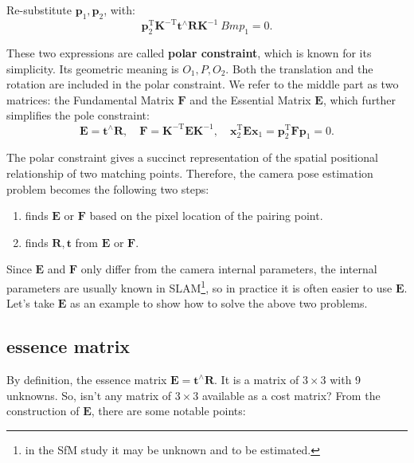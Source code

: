 Re-substitute $\bm{p}_1, \bm{p}_2$, with:
\begin{equation}
\bm{p}_2^\mathrm{T} \bm{K}^{-\mathrm{T}} \bm{t}^\wedge \bm{R} \bm{K}^{-1} \ Bm{p}_1 = 0.
\end{equation}

These two expressions are called \textbf{polar constraint}, which is known for its simplicity. Its geometric meaning is $O_1, P, O_2$. Both the translation and the rotation are included in the polar constraint. We refer to the middle part as two matrices: the Fundamental Matrix $\bm{F}$ and the Essential Matrix $\bm{E}$, which further simplifies the pole constraint:
\begin{equation}
\bm{E} = \bm{t}^ \wedge \bm{R}, \quad \bm{F} = \bm{K}^{ -\mathrm{T}} \bm{E} {\bm {K}^{ - 1}}, \quad \bm{x}_2^\mathrm{T} \bm{E} {\bm{x}_1} = \bm{p}_2^\mathrm{T} \bm{F} {\bm{p}_1} = 0.
\end{equation}

The polar constraint gives a succinct representation of the spatial positional relationship of two matching points. Therefore, the camera pose estimation problem becomes the following two steps:

\begin{enumerate}
\item finds $\bm{E}$ or $\bm{F}$ based on the pixel location of the pairing point.
\item finds $\bm{R}, \bm{t}$ from $\bm{E}$ or $\bm{F}$.
\end{enumerate}

Since $\bm{E}$ and $\bm{F}$ only differ from the camera internal parameters, the internal parameters are usually known in SLAM\footnote{in the SfM study it may be unknown and to be estimated. }, so in practice it is often easier to use $\bm{E}$. Let's take $\bm{E}$ as an example to show how to solve the above two problems.

\subsection{essence matrix}
By definition, the essence matrix $\bm{E} = \bm{t}^\wedge \bm{R}$. It is a matrix of $3\times 3$ with 9 unknowns. So, isn't any matrix of $3 \times 3$ available as a cost matrix? From the construction of $\bm{E}$, there are some notable points:

